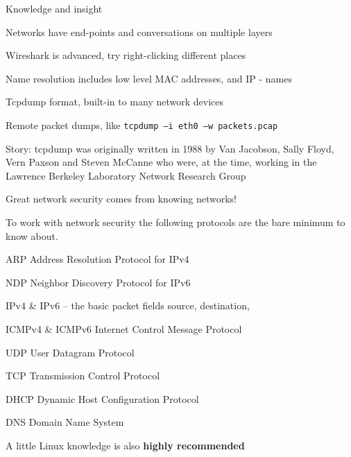 \documentclass[Screen16to9,17pt]{foils}
\begin{document}

{\Large Knowledge and insight}
\begin{list2}
\item Networks have end-points and conversations on multiple layers
\item Wireshark is advanced, try right-clicking different places
\item Name resolution includes low level MAC addresses, and IP - names
\end{list2}

\begin{list2}
\item Tcpdump format, built-in to many network devices
\item Remote packet dumps, like \verb+tcpdump –i eth0 –w packets.pcap+
\item Story: tcpdump was originally written in 1988 by Van Jacobson, Sally Floyd, Vern Paxson and Steven McCanne who were, at the time, working in the Lawrence Berkeley Laboratory Network Research Group\\
\end{list2}

\vskip 5mm

\centerline{\Large Great network security comes from knowing networks!}




To work with network security the following protocols are the bare minimum to know about.

\begin{list2}
\item ARP Address Resolution Protocol for IPv4
\item NDP Neighbor Discovery Protocol for IPv6
\item IPv4 \& IPv6 -- the basic packet fields source, destination,
\item ICMPv4 \& ICMPv6 Internet Control Message Protocol
\item UDP User Datagram Protocol
\item TCP Transmission Control Protocol
\item DHCP Dynamic Host Configuration Protocol
\item DNS Domain Name System
\end{list2}

\centerline{A little Linux knowledge is also {\bf highly recommended}}
\end{document}
